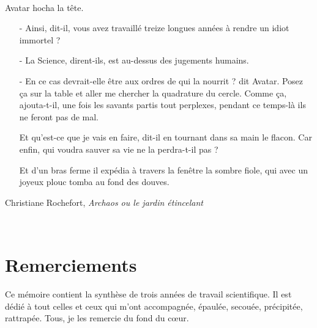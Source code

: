 {} {

~\newpage\thispagestyle{empty}\addtocounter{page}{-1}
\vspace{0.5\linewidth}
  Avatar hocha la tête.
  \begin{itemize}
	\item[-] Ainsi, dit-il, vous avez travaillé treize longues années à rendre un idiot immortel ?   
	\item[-] La Science, dirent-ils, est au-dessus des jugements humains.
	\item[-] En ce cas devrait-elle être aux ordres de qui la nourrit ? dit Avatar. Posez ça sur la table et aller me chercher la quadrature du cercle. Comme ça, ajouta-t-il, une fois les savants partis tout perplexes, pendant ce temps-là ils ne feront pas de mal.
	\item[ ] Et qu'est-ce que je vais en faire, dit-il en tournant dans sa main le flacon. Car enfin, qui voudra sauver sa vie ne la perdra-t-il pas ?
	\item[ ] Et d'un bras ferme il expédia à travers la fenêtre la sombre fiole, qui avec un joyeux plouc tomba au fond des douves.
  \end{itemize} 
\begin{flushright}
  Christiane Rochefort,  \emph{Archaos ou le jardin étincelant}\\
\end{flushright}


\newpage\thispagestyle{empty}\addtocounter{page}{-1}
~\newpage\thispagestyle{empty}\addtocounter{page}{-1}

\section*{Remerciements}

Ce mémoire contient la synthèse de trois années de travail scientifique. Il est dédié à tout celles et ceux qui m'ont accompagnée, épaulée, secouée, précipitée, rattrapée. Tous, je les remercie du fond du cœur.

}
